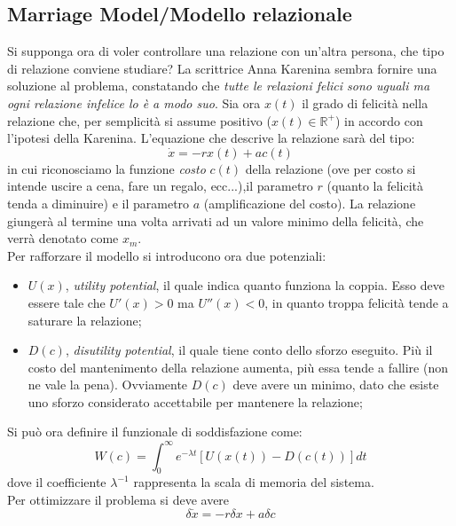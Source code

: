 \documentclass[12pt, a4paper]{book}
\theoremstyle{theorem}
\begin{document}
			\subsection{Marriage Model/Modello relazionale}
				Si supponga ora di voler controllare una relazione con un'altra persona, che tipo di relazione conviene studiare?
				La scrittrice Anna Karenina sembra fornire una soluzione al problema, constatando che \emph{tutte le relazioni felici sono uguali ma ogni relazione infelice lo è a modo suo}.
				Sia ora $x(t)$ il grado di felicità nella relazione che, per semplicità si assume positivo ($x(t)\in\mathbb{R}^{+}$) in accordo con l'ipotesi della Karenina.
				L'equazione che descrive la relazione sarà del tipo:
				\begin{equation}
					\dot{x}=-rx(t)+ac(t)
				\end{equation}
				in cui riconosciamo la funzione \emph{costo} $c(t)$ della relazione (ove per costo si intende uscire a cena, fare un regalo, ecc...),il parametro $r$ (quanto la felicità tenda a diminuire) e il parametro $a$ (amplificazione del costo).
				La relazione giungerà al termine una volta arrivati ad un valore minimo della felicità, che verrà denotato come $x_{m}$.
				\\Per rafforzare il modello si introducono ora due potenziali:
				\begin{itemize}
					\item $U(x)$, \emph{utility potential}, il quale indica quanto funziona la coppia.
						Esso deve essere tale che $U'(x)>0$ ma $U''(x)<0$, in quanto troppa felicità tende a saturare la relazione;
					\item $D(c)$, \emph{disutility potential}, il quale tiene conto dello sforzo eseguito.
						Più il costo del mantenimento della relazione aumenta, più essa tende a fallire (non ne vale la pena).
						Ovviamente $D(c)$ deve avere un minimo, dato che esiste uno sforzo considerato accettabile per mantenere la relazione;
				\end{itemize}
				Si può ora definire il funzionale di soddisfazione come:
				\begin{equation*}
					W(c)=\int_{0}^{\infty}e^{-\lambda t}\left[U\left(x(t)\right)-D\left(c(t)\right)\right]dt
				\end{equation*}
				dove il coefficiente $\lambda^{-1}$ rappresenta la scala di memoria del sistema.
				\\Per ottimizzare il problema si deve avere
				\begin{equation*}
					\delta\dot{x}=-r\delta x+a\delta c
				\end{equation*}
\end{document}
